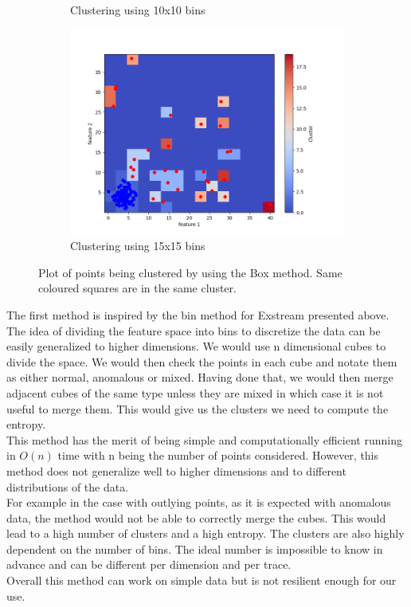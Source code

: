 \documentclass[oneside, a4paper, onecolumn, 11pt]{article}
\begin{document}
\begin{figure}[H]
\begin{subfigure}{0.35\textwidth}
      \caption{Clustering using 10x10 bins}
  \end{subfigure}
  \hfill
  \begin{subfigure}{0.35\textwidth}
      \centering
      \includegraphics[width=\linewidth]{images/bad clustercube1.png}
      \caption{Clustering using 15x15 bins}
  \end{subfigure}
  \caption{Plot of points being clustered by using the Box method. Same coloured squares are in the same cluster.}
\end{figure}
The first method is inspired by the bin method for Exstream \cite{MijaExstream} presented above. The idea of dividing the feature space into bins to discretize the data can be easily generalized to higher dimensions. We would use n dimensional cubes to divide the space. We would then check the points in each cube and notate them as either normal, anomalous or mixed. Having done that, we would then merge adjacent cubes of the same type unless they are mixed in which case it is not useful to merge them. This would give us the clusters we need to compute the entropy.\\
This method has the merit of being simple and computationally efficient running in $O(n)$ time with n being the number of points considered. However, this method does not generalize well to higher dimensions and to different distributions of the data.\\
For example in the case with outlying points, as it is expected with anomalous data, the method would not be able to correctly merge the cubes. This would lead to a high number of clusters and a high entropy. The clusters are also highly dependent on the number of bins. The ideal number is impossible to know in advance and can be different per dimension and per trace.\\
Overall this method can work on simple data but is not resilient enough for our use.\\
\end{document}
